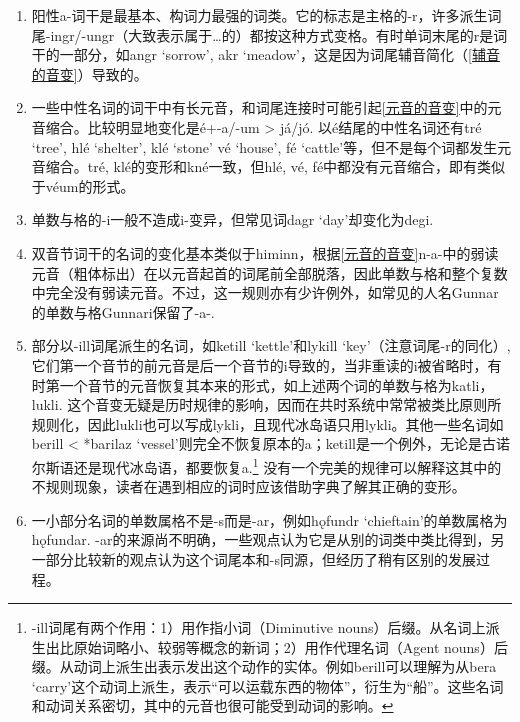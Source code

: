 \begin{enumerate}
  \def\labelenumi{\arabic{enumi})}
  \item
        阳性a-词干是最基本、构词力最强的词类。它的标志是主格的-r，许多派生词尾-ingr/-ungr（大致表示属于\ldots 的）都按这种方式变格。有时单词末尾的r是词干的一部分，如angr
        `sorrow', akr
        `meadow'，这是因为词尾辅音简化（\ref{辅音的音变}）导致的。
  \item
        一些中性名词的词干中有长元音，和词尾连接时可能引起\ref{元音的音变}中的元音缩合。比较明显地变化是é+-a/-um
        \textgreater{} já/jó. 以é结尾的中性名词还有tré `tree', hlé `shelter',
        klé `stone' vé `house', fé
        `cattle'等，但不是每个词都发生元音缩合。tré,
        klé的变形和kné一致，但hlé, vé,
        fé中都没有元音缩合，即有类似于véum的形式。
  \item
        单数与格的-i一般不造成i-变异，但常见词dagr `day'却变化为degi.
  \item
        双音节词干的名词的变化基本类似于himinn，根据\ref{元音的音变}n-a-中的弱读元音（粗体标出）在以元音起首的词尾前全部脱落，因此单数与格和整个复数中完全没有弱读元音。不过，这一规则亦有少许例外，如常见的人名Gunnar的单数与格Gunnari保留了-a-.
  \item
        部分以-ill词尾派生的名词，如ketill `kettle'和lykill
        `key'（注意词尾-r的同化）,
        它们第一个音节的前元音是后一个音节的i导致的，当非重读的i被省略时，有时第一个音节的元音恢复其本来的形式，如上述两个词的单数与格为katli，lukli.
        这个音变无疑是历时规律的影响，因而在共时系统中常常被类比原则所规则化，因此lukli也可以写成lykli，且现代冰岛语只用lykli。其他一些名词如berill
        \textless{} *barilaz
        `vessel'则完全不恢复原本的a；ketill是一个例外，无论是古诺尔斯语还是现代冰岛语，都要恢复a.\footnote{-ill词尾有两个作用：1）用作指小词（Diminutive
          nouns）后缀。从名词上派生出比原始词略小、较弱等概念的新词；2）用作代理名词（Agent
          nouns）后缀。从动词上派生出表示发出这个动作的实体。例如berill可以理解为从bera
          `carry'这个动词上派生，表示``可以运载东西的物体''，衍生为``船''。这些名词和动词关系密切，其中的元音也很可能受到动词的影响。}
        没有一个完美的规律可以解释这其中的不规则现象，读者在遇到相应的词时应该借助字典了解其正确的变形。
  \item
        一小部分名词的单数属格不是-s而是-ar，例如hǫfundr
        `chieftain'的单数属格为hǫfundar.
        -ar的来源尚不明确，一些观点认为它是从别的词类中类比得到，另一部分比较新的观点认为这个词尾本和-s同源，但经历了稍有区别的发展过程。
\end{enumerate}

